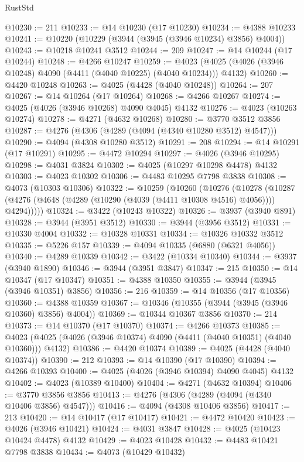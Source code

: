 \begin{lexlean}{RustStd}
\begin{coremodule}
@10230 := 211
@10233 := @14 @10230 (@17 @10230)
@10234 := @4388 @10233
@10241 := @10220 (@10229 (@3944 (@3945 (@3946 @10234) @3856) @4004))
@10243 := @10218 @10241 @3512
@10244 := 209
@10247 := @14 @10244 (@17 @10244)
@10248 := @4266 @10247
@10259 := @4023 (@4025 (@4026 (@3946 @10248) @4090 (@4411 (@4040 @10225) (@4040 @10234))) @4132)
@10260 := @4420 @10248
@10263 := @4025 (@4428 (@4040 @10248))
@10264 := 207
@10267 := @14 @10264 (@17 @10264)
@10268 := @4266 @10267
@10274 := @4025 (@4026 (@3946 @10268) @4090 @4045) @4132
@10276 := @4023 (@10263 @10274)
@10278 := @4271 (@4632 @10268)
@10280 := @3770 @3512 @3856
@10287 := @4276 (@4306 (@4289 (@4094 (@4340 @10280 @3512) @4547)))
@10290 := @4094 (@4308 @10280 @3512)
@10291 := 208
@10294 := @14 @10291 (@17 @10291)
@10295 := @4472 @10294
@10297 := @4026 (@3946 @10295)
@10298 := @4031 @3824
@10302 := @4025 (@10297 @10298 @4478) @4132
@10303 := @4023 @10302
@10306 := @4483 @10295 @7798 @3838
@10308 := @4073 (@10303 @10306)
@10322 := @10259
    (@10260
      (@10276
        (@10278
          (@10287 (@4276 (@4648 (@4289 (@10290 (@4039 (@4411 @10308 @4516) @4056)))) @4294)))))
@10324 := @3422 (@10243 @10322)
@10326 := @3937 (@3940 @891)
@10328 := @3944 (@3951 @3512)
@10330 := @3944 (@3956 @3512)
@10331 := @10330 @4004
@10332 := @10328 @10331
@10334 := @10326 @10332 @3512
@10335 := @5226 @157
@10339 := @4094 @10335 (@6880 (@6321 @4056))
@10340 := @4289 @10339
@10342 := @3422 (@10334 @10340)
@10344 := @3937 (@3940 @1890)
@10346 := @3944 (@3951 @3847)
@10347 := 215
@10350 := @14 @10347 (@17 @10347)
@10351 := @4388 @10350
@10355 := @3944 (@3945 (@3946 @10351) @3856)
@10356 := 216
@10359 := @14 @10356 (@17 @10356)
@10360 := @4388 @10359
@10367 := @10346 (@10355 (@3944 (@3945 (@3946 @10360) @3856) @4004))
@10369 := @10344 @10367 @3856
@10370 := 214
@10373 := @14 @10370 (@17 @10370)
@10374 := @4266 @10373
@10385 := @4023 (@4025 (@4026 (@3946 @10374) @4090 (@4411 (@4040 @10351) (@4040 @10360))) @4132)
@10386 := @4420 @10374
@10389 := @4025 (@4428 (@4040 @10374))
@10390 := 212
@10393 := @14 @10390 (@17 @10390)
@10394 := @4266 @10393
@10400 := @4025 (@4026 (@3946 @10394) @4090 @4045) @4132
@10402 := @4023 (@10389 @10400)
@10404 := @4271 (@4632 @10394)
@10406 := @3770 @3856 @3856
@10413 := @4276 (@4306 (@4289 (@4094 (@4340 @10406 @3856) @4547)))
@10416 := @4094 (@4308 @10406 @3856)
@10417 := 213
@10420 := @14 @10417 (@17 @10417)
@10421 := @4472 @10420
@10423 := @4026 (@3946 @10421)
@10424 := @4031 @3847
@10428 := @4025 (@10423 @10424 @4478) @4132
@10429 := @4023 @10428
@10432 := @4483 @10421 @7798 @3838
@10434 := @4073 (@10429 @10432)

\end{coremodule}
\end{lexlean}
